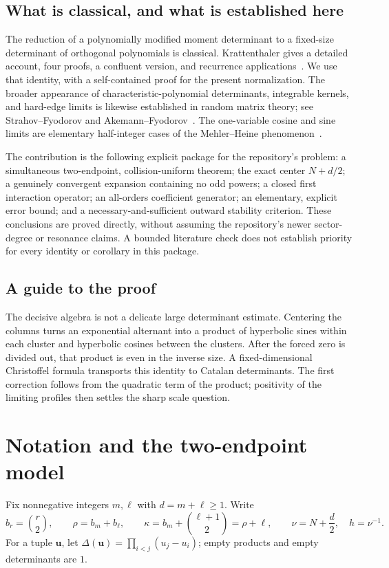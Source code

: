 \documentclass[11pt,a4paper]{article}
\numberwithin{equation}{section}
\theoremstyle{definition}
\theoremstyle{remark}
\newcommand{\Del}{\Delta}
\newcommand{\bu}{\boldsymbol u}
\begin{document}
\subsection{What is classical, and what is established here}
The reduction of a polynomially modified moment determinant to a
fixed-size determinant of orthogonal polynomials is classical.
Krattenthaler gives a detailed account, four proofs, a confluent version,
and recurrence applications~\cite{Krattenthaler2023}. We use that identity,
with a self-contained proof for the present normalization. The broader
appearance of characteristic-polynomial determinants, integrable kernels,
and hard-edge limits is likewise established in random matrix theory;
see Strahov--Fyodorov and Akemann--Fyodorov~\cite{StrahovFyodorov2003,AkemannFyodorov2003}. The one-variable
cosine and sine limits are elementary half-integer cases of the
Mehler--Heine phenomenon~\cite{DLMFMehlerHeine}.

The contribution is the following explicit package for the repository's
problem: a simultaneous two-endpoint, collision-uniform theorem; the exact
center $N+d/2$; a genuinely convergent expansion containing no odd powers;
a closed first interaction operator; an all-orders coefficient generator;
an elementary, explicit error bound; and a necessary-and-sufficient
outward stability criterion. These conclusions are proved directly,
without assuming the repository's newer sector-degree or resonance
claims. A bounded literature check does not establish priority for every
identity or corollary in this package.

\subsection{A guide to the proof}
The decisive algebra is not a delicate large determinant estimate.
Centering the columns turns an exponential alternant into a product of
hyperbolic sines within each cluster and hyperbolic cosines between the
clusters. After the forced zero is divided out, that product is even in
the inverse size. A fixed-dimensional Christoffel formula transports this
identity to Catalan determinants. The first correction follows from the
quadratic term of the product; positivity of the limiting profiles then
settles the sharp scale question.

\section{Notation and the two-endpoint model}\label{tec:sec:model}
Fix nonnegative integers $m,\ell$ with $d=m+\ell\ge1$. Write
\begin{equation}\label{tec:eq:indices}
 b_r=\binom r2,\qquad \rho=b_m+b_\ell,\qquad
 \kappa=b_m+\binom{\ell+1}{2}=\rho+\ell,
 \qquad \nu=N+\frac d2,\quad h=\nu^{-1}.
\end{equation}
For a tuple $\bu$, let $\Del(\bu)=\prod_{i<j}(u_j-u_i)$; empty
products and empty determinants are $1$.
\end{document}
